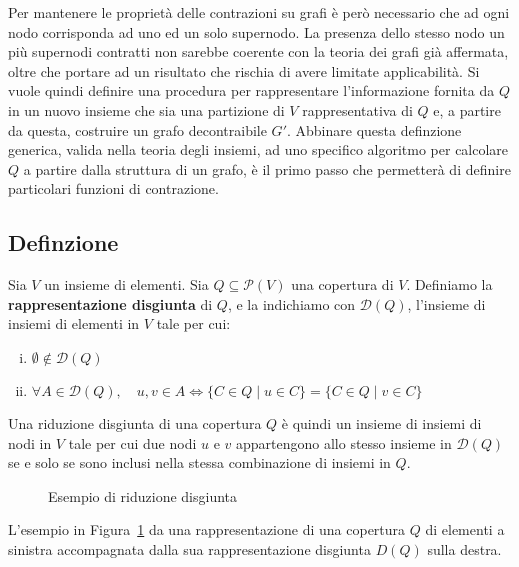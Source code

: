 Per mantenere le proprietà delle contrazioni su grafi è però necessario che ad ogni nodo corrisponda ad uno ed un solo
supernodo.
La presenza dello stesso nodo un più supernodi contratti non sarebbe coerente con la teoria dei grafi
già affermata, oltre che portare ad un risultato che rischia di avere limitate applicabilità.
Si vuole quindi definire una procedura per rappresentare l'informazione fornita da $Q$ in un nuovo insieme che sia una
partizione di $V$ rappresentativa di $Q$ e, a partire da questa, costruire un grafo decontraibile $G'$.
Abbinare questa definzione generica, valida nella teoria degli insiemi, ad uno specifico algoritmo per calcolare
$Q$ a partire dalla struttura di un grafo, è il primo passo che permetterà di definire particolari funzioni di
contrazione.

\subsection{Definzione}

\begin{defintion} \newline
Sia $V$ un insieme di elementi. Sia $Q \subseteq \mathcal{P}(V)$ una copertura di $V$.
Definiamo la \textbf{rappresentazione disgiunta} di $Q$, e la indichiamo con $\mathcal{D}(Q)$,
l'insieme di insiemi di elementi in $V$ tale per cui:
\begin{enumerate}[(i)]
    \item $\emptyset \notin \mathcal{D}(Q)$
    \item $\forall A \in \mathcal{D}(Q), \quad u, v \in A \Leftrightarrow \{C \in Q \mid u \in C\} = \{C \in Q \mid v \in C\}$
\end{enumerate}
\end{defintion}

Una riduzione disgiunta di una copertura $Q$ è quindi un insieme di insiemi di nodi in $V$ tale per cui due
nodi $u$ e $v$ appartengono allo stesso insieme in $\mathcal{D}(Q)$ se e solo se sono inclusi nella stessa combinazione
di insiemi in $Q$. \newline

\begin{figure}[!h] \centering

\caption{Esempio di riduzione disgiunta}
\label{fig:disjoint_reduction_example}
\end{figure}

L'esempio in Figura~\ref{fig:disjoint_reduction_example} da una rappresentazione di una copertura $Q$ di elementi a
sinistra accompagnata dalla sua rappresentazione disgiunta $D(Q)$ sulla destra.

